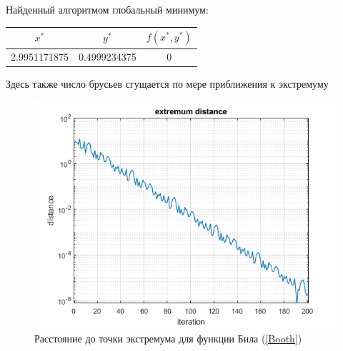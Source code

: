 \documentclass[12pt,a4paper]{article}
\begin{document}
                Найденный алгоритмом глобальный минимум:
             \begin{center}
                    \begin{tabular}{ |c|c|c| } 
                         \hline
                         $ x^*$ & $y^*$ & $f(x^*, y^*)$ \\ 
                         \hline
                         2.9951171875 & 0.4999234375 & 0 \\ 
                         \hline
                    \end{tabular}
                \end{center}
                
                Здесь также число брусьев сгущается по мере приближения к экстремуму
                
                \begin{figure}[H]
                    \centering
                    \includegraphics[width=13cm]{Booth_extr_dist.png}
                    \caption{Расстояние до точки экстремума для функции Била (\ref{Booth})}
                    \label{fig:Boot3}
                \end{figure}
                
\end{document}
